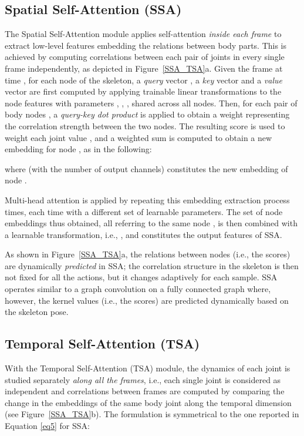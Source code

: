 \documentclass[times,twocolumn,final,authoryear]{elsarticle}
\begin{document}
\subsection{Spatial Self-Attention (SSA)}
\label{sec:ssa-descr}

The Spatial Self-Attention module applies self-attention \textit{inside each frame} to extract low-level features embedding the relations between body parts. This is achieved by computing correlations between each pair of joints in every single frame independently, as depicted in Figure~\ref{SSA_TSA}a. 
Given the frame at time , for each node  of the skeleton, a \textit{query} vector  , a \textit{key} vector  and a \textit{value} vector  are first computed by applying trainable linear transformations to the node features  with parameters , , , shared across all nodes. Then, for each pair of body nodes , a \textit{query-key dot product} is applied to obtain a weight  representing the correlation strength between the two nodes. The resulting score  is used to weight each joint value , and a weighted sum is computed to obtain a new embedding  for node , as in the following:

where  (with  the number of output channels) constitutes the new embedding of node .


Multi-head attention is applied by repeating this embedding extraction process  times, each time with a different set of learnable parameters. The set  of node embeddings thus obtained, all referring to the same node , is then combined with a learnable transformation, i.e., , and constitutes the output features of SSA.

As shown in Figure~\ref{SSA_TSA}a, the relations between nodes (i.e., the  scores) are dynamically \textit{predicted} in SSA; the correlation structure in the skeleton is then not fixed for all the actions, but it changes adaptively for each sample. SSA operates similar to a graph convolution on a fully connected graph where, however, the kernel values (i.e., the  scores) are predicted dynamically based on the skeleton pose.


\subsection{Temporal Self-Attention (TSA)}\label{sec:st}

With the Temporal Self-Attention (TSA) module, the dynamics of each joint is studied separately \textit{along all the frames}, i.e., each single joint is considered as independent and correlations between frames are computed by comparing the change in the embeddings of the same body joint along the temporal dimension (see Figure~\ref{SSA_TSA}b). The formulation is symmetrical to the one reported in Equation \eqref{eq5} for SSA:
\end{document}
